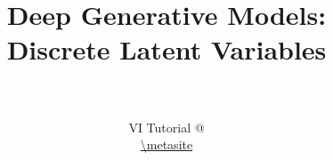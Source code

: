 \documentclass[14pt]{beamer}
\title[Discrete DGMs]{Deep Generative Models: \\
Discrete Latent Variables}
\date{}
\author[VI Tutorial @ \metahost]{ \metaauthor \\ 
~\\
VI Tutorial @ \metahost \\
\url{\metasite}
}
\begin{document}
\frame{\titlepage}



\frame{\tableofcontents}


\end{document}
